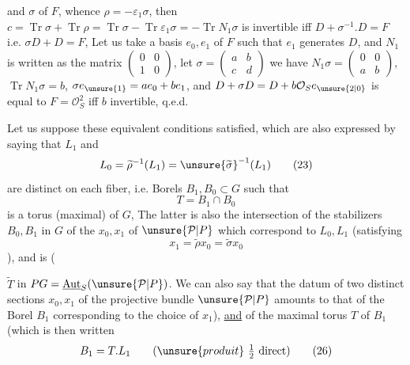 and    $\sigma$ of $F$, whence
$\rho=-\varepsilon_1\sigma$, then 
$c=\operatorname{Tr}\sigma+\operatorname{Tr}\rho=\operatorname{Tr}\sigma-\operatorname{Tr}\varepsilon_1\sigma
=-\operatorname{Tr}N_1\sigma$ is invertible iff $D+\sigma^{-1}.D=F$
i.e. $\sigma D+D=F$,  Let us take a basis
$e_0,e_1$ of $F$ such that $e_1$ generates $D$, and $N_1$ is written as the matrix
$\begin{pmatrix}0&0\\1&0\end{pmatrix}$,
let $\sigma=\begin{pmatrix}a&b\\c&d\end{pmatrix}$ we have
$N_1\sigma=\begin{pmatrix}0&0\\a&b\end{pmatrix}$,
$\operatorname{Tr}N_1\sigma=b$,
$\sigma e_{\unsure{1}}=a e_0+b e_1$, and
$D+\sigma D=D+b\mathcal O_S e_{\unsure{2|0}}$
is equal to $F=\mathcal O_S^2$ iff $b$ invertible, q.e.d.

Let us suppose these equivalent conditions satisfied,  which are also expressed by saying that $L_1$ and
\[
L_0=\widetilde\rho^{-1}(L_1)=\unsure{\widetilde\sigma}^{-1}(L_1)
\tag{23}
\]
are distinct on each fiber, i.e.  Borels $B_1,B_0\subset G$ such that
\[
T=B_1\cap B_0
\tag{24}
\]
is a torus (maximal) of $G$, 
The latter is also the  intersection of the stabilizers $B_0,B_1$ in $G$ of the 
$x_0,x_1$ of $\unsure{\mathcal P|P}$ which correspond to $L_0,L_1$
(satisfying
\[
x_1=\widetilde\rho x_0=\widetilde\sigma x_0
\tag{25}
\]
), and is    ( 



 $\widetilde T$ in $PG=\underline{\operatorname{Aut}}_S(\unsure{\mathcal P|P})$.
We can also say that the datum of two distinct sections 
$x_0,x_1$ of the projective bundle $\unsure{\mathcal P|P}$  amounts to that of the Borel
$B_1$ corresponding to the choice of $x_1$), \uline{and} of the maximal torus $T$ of $B_1$
(which is then written
\[
B_1=T.L_1 \qquad (\unsure{produit}\ \tfrac12\ \text{direct})
\tag{26}
\]

